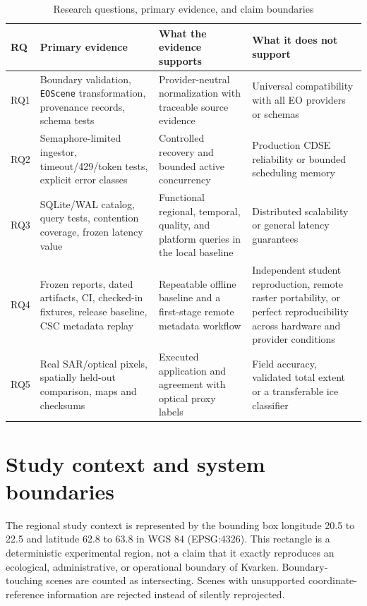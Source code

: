 \begin{table}[htbp]
\centering
\caption{Research questions, primary evidence, and claim boundaries}
\small
\begin{tabular}{p{}p{}p{}p{}}
\toprule
\textbf{RQ} & \textbf{Primary evidence} & \textbf{What the evidence supports} & \textbf{What it does not support} \\
\midrule
RQ1 & Boundary validation, \texttt{EOScene} transformation, provenance records, schema tests & Provider-neutral normalization with traceable source evidence & Universal compatibility with all EO providers or schemas \\
RQ2 & Semaphore-limited ingestor, timeout/429/token tests, explicit error classes & Controlled recovery and bounded active concurrency & Production CDSE reliability or bounded scheduling memory \\
RQ3 & SQLite/WAL catalog, query tests, contention coverage, frozen latency value & Functional regional, temporal, quality, and platform queries in the local baseline & Distributed scalability or general latency guarantees \\
RQ4 & Frozen reports, dated artifacts, CI, checked-in fixtures, release baseline, CSC metadata replay & Repeatable offline baseline and a first-stage remote metadata workflow & Independent student reproduction, remote raster portability, or perfect reproducibility across hardware and provider conditions \\
RQ5 & Real SAR/optical pixels, spatially held-out comparison, maps and checksums & Executed application and agreement with optical proxy labels & Field accuracy, validated total extent or a transferable ice classifier \\
\bottomrule
\end{tabular}
\end{table}

\section{Study context and system boundaries}

The regional study context is represented by the bounding box longitude 20.5 to 22.5 and latitude 62.8 to 63.8 in WGS 84 (EPSG:4326). This rectangle is a deterministic experimental region, not a claim that it exactly reproduces an ecological, administrative, or operational boundary of Kvarken. Boundary-touching scenes are counted as intersecting. Scenes with unsupported coordinate-reference information are rejected instead of silently reprojected.

